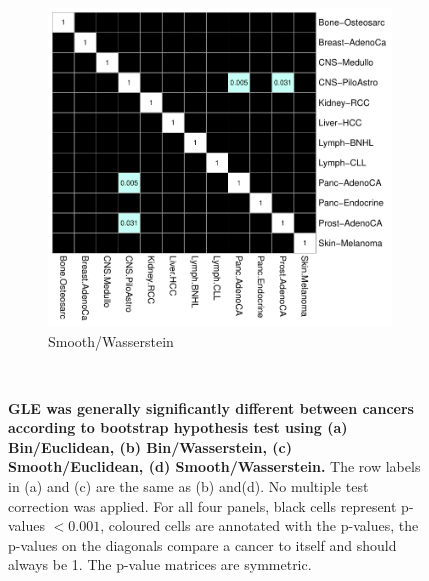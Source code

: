 \begin{figure}[ht!]
\begin{subfigure}{.55\textwidth}
    \includegraphics[scale=0.65]{graphics/bootstrap_smooth_wasserstein.pdf}
    \caption{Smooth/Wasserstein}
    \label{fig:smooth_wasserstein}
    \end{subfigure} \\
    \caption{\textbf{GLE was generally significantly different between cancers according to bootstrap hypothesis test using (a) Bin/Euclidean, (b) Bin/Wasserstein, (c) Smooth/Euclidean, (d) Smooth/Wasserstein.} The row labels in (a) and (c) are the same as (b) and(d). No multiple test correction was applied. For all four panels, black cells represent p-values $<0.001$, coloured cells are annotated with the p-values, the p-values on the diagonals compare a cancer to itself and should always be 1. The p-value matrices are symmetric.}
    \label{fig:gle_bootstrap}
\end{figure}